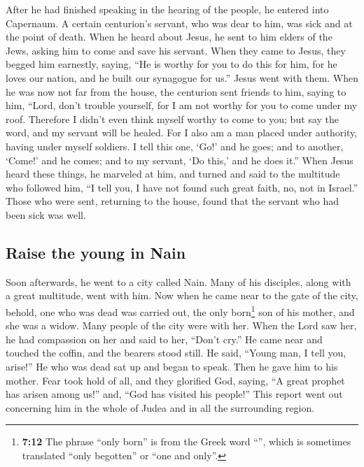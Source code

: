  After he had finished speaking in the hearing of the
people, he entered into Capernaum.  A certain centurion's
servant, who was dear to him, was sick and at the point of death.
 When he heard about Jesus, he sent to him elders of the
Jews, asking him to come and save his servant.  When they
came to Jesus, they begged him earnestly, saying, ``He is worthy for you
to do this for him,  for he loves our nation, and he built
our synagogue for us.''  Jesus went with them. When he was
now not far from the house, the centurion sent friends to him, saying to
him, ``Lord, don't trouble yourself, for I am not worthy for you to come
under my roof.  Therefore I didn't even think myself
worthy to come to you; but say the word, and my servant will be healed.
 For I also am a man placed under authority, having under
myself soldiers. I tell this one, `Go!' and he goes; and to another,
`Come!' and he comes; and to my servant, `Do this,' and he does it.''
 When Jesus heard these things, he marveled at him, and
turned and said to the multitude who followed him, ``I tell you, I have
not found such great faith, no, not in Israel.''  Those
who were sent, returning to the house, found that the servant who had
been sick was well.

\hypertarget{raise-the-young-in-nain}{%
\subsection{Raise the young in Nain}\label{raise-the-young-in-nain}}

 Soon afterwards, he went to a city called Nain. Many of
his disciples, along with a great multitude, went with him.
 Now when he came near to the gate of the city, behold,
one who was dead was carried out, the only born\footnote{\textbf{7:12}
  The phrase ``only born'' is from the Greek word ``'',
  which is sometimes translated ``only begotten'' or ``one and only''.}
son of his mother, and she was a widow. Many people of the city were
with her.  When the Lord saw her, he had compassion on
her and said to her, ``Don't cry.''  He came near and
touched the coffin, and the bearers stood still. He said, ``Young man, I
tell you, arise!''  He who was dead sat up and began to
speak. Then he gave him to his mother.  Fear took hold of
all, and they glorified God, saying, ``A great prophet has arisen among
us!'' and, ``God has visited his people!''  This report
went out concerning him in the whole of Judea and in all the surrounding
region.

